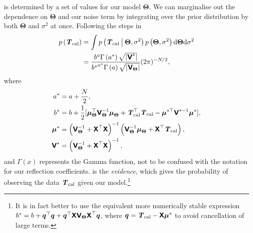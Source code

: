  is determined by a set of values for our model $\boldsymbol{\Theta}$. We can marginalise out the dependence on $\boldsymbol{\Theta}$ and our noise term by integrating over the prior distribution by both $\boldsymbol{\Theta}$ and $\sigma^2$ at once. Following the steps in \citet{banerjee}
\begin{equation}
    \begin{aligned} \label{eqn:ev}
    p\left(\y\right) &= \int p\left(\y \given[\big] \boldsymbol{\Theta}, \sigma^2\right) p\left(\boldsymbol{\Theta}, \sigma^2\right) \mathrm{d}\boldsymbol{\Theta} \mathrm{d}\sigma^2\\
    &= \frac{b^a\Gamma\left(a^*\right)\sqrt{|\mathbfss{V}^*|}}{{b^*}^{a^*}\Gamma\left(a\right)\sqrt{|\mathbfss{V}_{\boldsymbol{\Theta}}|}}(2\pi)^{-N/2}, \\
    \end{aligned}
\end{equation}
where 
\begin{equation}\label{starred}
    \begin{aligned}   
    a^* &= a + \frac{N}{2}, \\
    b^* &= b + \frac{1}{2}[\boldsymbol{\mu}_{\boldsymbol{\Theta}}^{\top}\mathbfss{V}_{\boldsymbol{\Theta}}^{-1}\boldsymbol{\mu}_{\boldsymbol{\Theta}} + \y^{\top}\y - \boldsymbol{\mu}^{*\top}\mathbfss{V}^{*-1}\boldsymbol{\mu}^*], \\
    \boldsymbol{\mu}^* &= \left(\mathbfss{V}_{\boldsymbol{\Theta}}^{-1} + \mathbfss{X}^{\top}\mathbfss{X}\right)^{-1}\left(\mathbfss{V}_{\boldsymbol{\Theta}}^{-1}\boldsymbol{\mu}_{\boldsymbol{\Theta}} + \mathbfss{X}^{\top}\y\right), \\
    \mathbfss{V}^* &= \left(\mathbfss{V}_{\boldsymbol{\Theta}}^{-1} + \mathbfss{X}^{\top}\mathbfss{X}\right)^{-1}, \\
    \end{aligned}
\end{equation}
and $\Gamma\left(x\right)$ represents the Gamma function, not to be confused with the notation for our reflection coefficients.  is the \textit{evidence}, which gives the probability of observing the data $\y$ given our model.\footnote{It is in fact better to use the equivalent more numerically stable expression
$b^*=b + \boldsymbol{q}^{\top} \boldsymbol{q} + \boldsymbol{q}^{\top} \mathbfss{X} \mathbfss{V}_{\boldsymbol{\Theta}} \mathbfss{X}^{\top} \boldsymbol{q}$,  where $\boldsymbol{q}= \y-\mathbfss{X}\boldsymbol{\mu}^*$ to avoid cancellation of large terms.}

